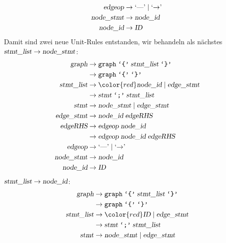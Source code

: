\begin{loesung}
\begin{teilaufgaben}
\begin{align*}
\textsl{edgeop}    &\rightarrow \textrm{`\text{---}'}\; |\; \textrm{`$\rightarrow$'}\; \\
\textsl{node\_stmt}&\rightarrow \textsl{node\_id} \\
\textsl{node\_id}  &\rightarrow \textsl{ID}
\end{align*}
Damit sind zwei neue Unit-Rules entstanden, wir behandeln als nächstes
$\textsl{stmt\_list}\to\textsl{node\_stmt}$:
\begin{align*}
\textsl{graph}     &\rightarrow \texttt{graph}\; \texttt{`\{'}\; \textsl{stmt\_list}\; \texttt{`\}'} \\
                   &\rightarrow \texttt{graph}\; \texttt{`\{'}\; \texttt{`\}'} \\
\textsl{stmt\_list}&\rightarrow {\color{red}\textsl{node\_id}}\; |\;
                                \textsl{edge\_stmt} \\
                   &\rightarrow \textsl{stmt}\; \texttt{`;'}\; \textsl{stmt\_list}\\
\textsl{stmt}      &\rightarrow \textsl{node\_stmt}\; |\;
                                \textsl{edge\_stmt} \\
\textsl{edge\_stmt}&\rightarrow \textsl{node\_id}\; \textsl{edgeRHS} \\
\textsl{edgeRHS}   &\rightarrow \textsl{edgeop}\; \textsl{node\_id}\\
                   &\rightarrow \textsl{edgeop}\; \textsl{node\_id}\; \textsl{edgeRHS}\\
\textsl{edgeop}    &\rightarrow \textrm{`\text{---}'}\; |\; \textrm{`$\rightarrow$'}\; \\
\textsl{node\_stmt}&\rightarrow \textsl{node\_id} \\
\textsl{node\_id}  &\rightarrow \textsl{ID}
\end{align*}
$\textsl{stmt\_list}\to\textsl{node\_id}$:
\begin{align*}
\textsl{graph}     &\rightarrow \texttt{graph}\; \texttt{`\{'}\; \textsl{stmt\_list}\; \texttt{`\}'} \\
                   &\rightarrow \texttt{graph}\; \texttt{`\{'}\; \texttt{`\}'} \\
\textsl{stmt\_list}&\rightarrow {\color{red}\textsl{ID}}\; |\;
                                \textsl{edge\_stmt} \\
                   &\rightarrow \textsl{stmt}\; \texttt{`;'}\; \textsl{stmt\_list}\\
\textsl{stmt}      &\rightarrow \textsl{node\_stmt}\; |\;
                                \textsl{edge\_stmt} \\

\end{align*}
\end{teilaufgaben}
\end{loesung}
